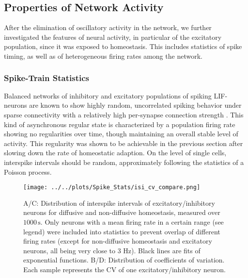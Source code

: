 \documentclass[10pt,a4paper]{article}
\begin{document}
\subsection{Properties of Network Activity}

After the elimination of oscillatory activity in the network, we further investigated the features of neural activity, in particular of the excitatory population, since it was exposed to homeostasis. This includes statistics of spike timing, as well as of heterogeneous firing rates among the network.  

\subsubsection{Spike-Train Statistics}
Balanced networks of inhibitory and excitatory populations of spiking LIF-neurons are known to show highly random, uncorrelated spiking behavior under sparse connectivity with a relatively high per-synapse connection strength \cite{Vreeswijk1996,Brunel2000}. This kind of asynchronous regular state is characterized by a population firing rate showing no regularities over time, though maintaining an overall stable level of activity. This regularity was shown to be achievable in the previous section after slowing down the rate of homeostatic adaption. On the level of single cells, interspike intervals should be random, approximately following the statistics of a Poisson process.   
\begin{figure}
\texttt{[image: ../../plots/Spike\_Stats/isi\_cv\_compare.png]}
\caption{A/C: Distribution of interspike intervals of excitatory/inhibitory neurons for diffusive and non-diffusive homeostasis, measured over $\mathrm{1000\,s}$. Only neurons with a mean firing rate in a certain range (see legend) were included into statistics to prevent overlap of different firing rates (except for non-diffusive homeostasis and excitatory neurons, all being very close to 3 Hz). Black lines are fits of exponential functions. B/D: Distribution of coefficients of variation. Each sample represents the CV of one excitatory/inhibitory neuron.}
\label{ISI_CV_compare}
\end{figure}
\end{document}
